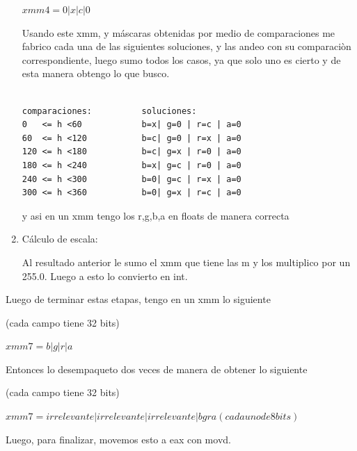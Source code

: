 \documentclass[a4paper]{article}
\begin{document}
\begin{enumerate}
	$xmm4 = 0|x|c|0	$
	
\vspace*{0.3cm}

Usando este xmm, y máscaras obtenidas por medio de comparaciones me fabrico cada una de las siguientes soluciones, y las andeo con su comparaciòn correspondiente, luego sumo todos los casos, ya que solo uno es cierto y de esta manera obtengo lo que busco.

\begin{verbatim}

comparaciones:          soluciones:
0   <= h <60            b=x| g=0 | r=c | a=0 
60  <= h <120           b=c| g=0 | r=x | a=0 
120 <= h <180           b=c| g=x | r=0 | a=0 
180 <= h <240           b=x| g=c | r=0 | a=0 
240 <= h <300           b=0| g=c | r=x | a=0 
300 <= h <360           b=0| g=x | r=c | a=0 

\end{verbatim}

y asi en un xmm tengo los r,g,b,a en floats de manera correcta

	\item Cálculo de escala:
	
	Al resultado anterior le sumo el xmm que tiene las m y los multiplico por un 255.0. Luego a esto lo convierto en int.

\end{enumerate}

Luego de terminar estas etapas, tengo en un xmm lo siguiente

\vspace*{0.3cm}

(cada campo tiene 32 bits)	
	
\vspace*{0.3cm}	

$xmm7 = b|g|r|a$

\vspace*{0.3cm}

Entonces lo desempaqueto dos veces de manera de obtener lo siguiente

\vspace*{0.3cm}

(cada campo tiene 32 bits)	
	
\vspace*{0.3cm}	

$xmm7 = irrelevante|irrelevante|irrelevante|bgra(cada uno de 8 bits)$

\vspace*{0.3cm}

Luego, para finalizar, movemos esto a eax con movd.
\end{document}
